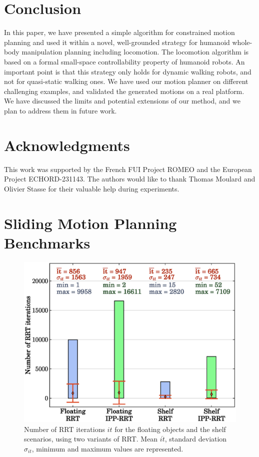 \documentclass{article}
\begin{document}
\section{Conclusion}

In this paper, we have presented a simple algorithm for constrained motion planning
and used it within a novel, well-grounded strategy for humanoid whole-body
manipulation planning including locomotion. The locomotion algorithm is based on a formal
small-space controllability property of humanoid robots. An important point is that
this strategy only holds for dynamic walking robots, and not for quasi-static walking ones.
We have used our motion planner on different challenging examples, and validated the
generated motions on a real platform. We have discussed the limits and potential extensions
of our method, and we plan to address them in future work.

\section{Acknowledgments}

This work was supported by the French FUI Project ROMEO and the European Project ECHORD-231143. The authors would like to thank Thomas Moulard and Olivier Stasse for their valuable help during experiments.

\appendix
\section{Sliding Motion Planning Benchmarks}
\label{app:bench}

\begin{figure}[H]
\centering
\includegraphics[width=0.8\linewidth]{plots/rrt-it.eps}
\caption{Number of RRT iterations $it$ for the floating objects and the
  shelf scenarios, using two variants of RRT. Mean $\overline{it}$,
  standard deviation $\sigma_{it}$, minimum and maximum values are
  represented.}
\label{fig:rrt-it}
\end{figure}
\end{document}
